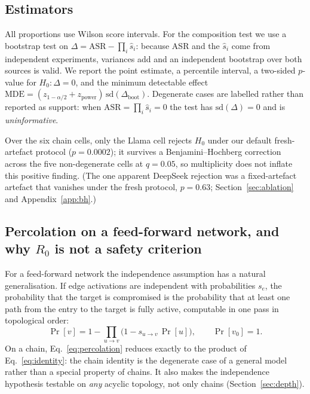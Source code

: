 \documentclass[sigconf,anonymous]{aamas}
\begin{document}
\subsection{Estimators}

All proportions use Wilson score intervals. For the composition test we use a
bootstrap test on $\Delta = \mathrm{ASR} - \prod_i \hat s_i$: because ASR and the
$\hat s_i$ come from independent experiments, variances add and an independent
bootstrap over both sources is valid. We report the point estimate, a percentile
interval, a two-sided $p$-value for $H_0\!: \Delta = 0$, and the minimum
detectable effect $\mathrm{MDE} = (z_{1-\alpha/2} + z_{\mathrm{power}})\,
\mathrm{sd}(\Delta_{\mathrm{boot}})$. Degenerate cases are labelled rather than
reported as support: when $\mathrm{ASR} = \prod_i \hat s_i = 0$ the test has
$\mathrm{sd}(\Delta) = 0$ and is \emph{uninformative}.

Over the six chain cells, only the Llama cell rejects $H_0$ under our default
fresh-artefact protocol ($p = 0.0002$); it survives a Benjamini--Hochberg
correction across the five non-degenerate cells at $q = 0.05$, so multiplicity does
not inflate this positive finding. (The one apparent DeepSeek rejection was a
fixed-artefact artefact that vanishes under the fresh protocol, $p = 0.63$;
Section~\ref{sec:ablation} and Appendix~\ref{app:bh}.)

\subsection{Percolation on a feed-forward network, and why $R_0$ is not a safety criterion}
\label{sec:threshold}

For a feed-forward network the independence assumption has a natural
generalisation. If edge activations are independent with probabilities $s_e$, the
probability that the target is compromised is the probability that at least one
path from the entry to the target is fully active, computable in one pass in
topological order:
\begin{equation}
\Pr[v] = 1 - \prod_{u \to v} \bigl(1 - s_{u\to v}\,\Pr[u]\bigr),
\qquad \Pr[v_0] = 1 .
\label{eq:percolation}
\end{equation}
On a chain, Eq.~\eqref{eq:percolation} reduces exactly to the product of
Eq.~\eqref{eq:identity}: the chain identity is the degenerate case of a general
model rather than a special property of chains. It also makes the independence
hypothesis testable on \emph{any} acyclic topology, not only chains
(Section~\ref{sec:depth}).
\end{document}
